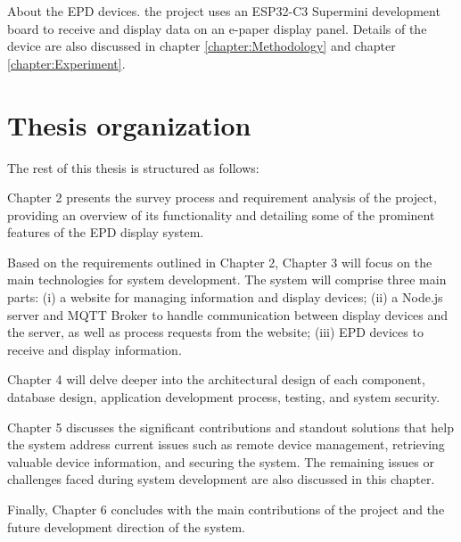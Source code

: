 \documentclass[../Main.tex]{subfiles}
\begin{document}
About the EPD devices. the project uses an ESP32-C3 Supermini development board to receive and display data on an e-paper display panel. Details of the device are also discussed in chapter \ref{chapter:Methodology} and chapter \ref{chapter:Experiment}.

\section{Thesis organization}
\label{section:1.4}

The rest of this thesis is structured as follows:

Chapter 2 presents the survey process and requirement analysis of the project, providing an overview of its functionality and detailing some of the prominent features of the EPD display system.

Based on the requirements outlined in Chapter 2, Chapter 3 will focus on the main technologies for system development. The system will comprise three main parts: (i) a website for managing information and display devices; (ii) a Node.js server and MQTT Broker to handle communication between display devices and the server, as well as process requests from the website; (iii) EPD devices to receive and display information.

Chapter 4 will delve deeper into the architectural design of each component, database design, application development process, testing, and system security.

Chapter 5 discusses the significant contributions and standout solutions that help the system address current issues such as remote device management, retrieving valuable device information, and securing the system. The remaining issues or challenges faced during system development are also discussed in this chapter.

Finally, Chapter 6 concludes with the main contributions of the project and the future development direction of the system.
\end{document}
